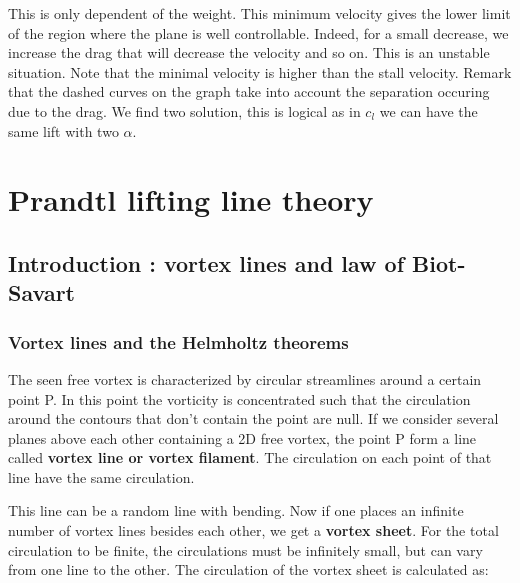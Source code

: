 	This is only dependent of the weight. This minimum velocity gives the lower limit of the region where the plane is well controllable. Indeed, for a small decrease, we increase the drag that will decrease the velocity and so on. This is an unstable situation. Note that the minimal velocity is higher than the stall velocity. Remark that the dashed curves on the graph take into account the separation occuring due to the drag. We find two solution, this is logical as in $c_l$ we can have the same lift with two $\alpha$. 
	
	
\section{Prandtl lifting line theory}
\subsection{Introduction : vortex lines and law of Biot-Savart}
\subsubsection{Vortex lines and the Helmholtz theorems}
	The seen free vortex is characterized by circular streamlines around a certain point P. In this point the vorticity is concentrated such that the circulation around the contours that don't contain the point are null. If we consider several planes above each other containing a 2D free vortex, the point P form a line called \textbf{vortex line or vortex filament}. The circulation on each point of that line have the same circulation. 
	
	\begin{center}
	\end{center}
	
	This line can be a random line with bending. Now if one places an infinite number of vortex lines besides each other, we get a \textbf{vortex sheet}. For the total circulation to be finite, the circulations must be infinitely small, but can vary from one line to the other. The circulation of the vortex sheet is calculated as:
	
